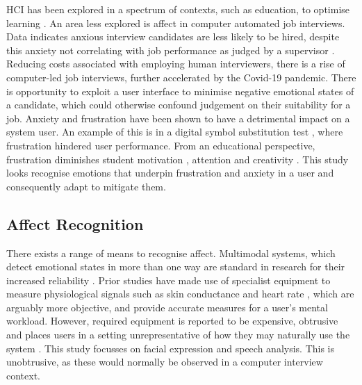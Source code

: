 \documentclass[12pt,a4paper]{article}
\begin{document}
HCI has been explored in a spectrum of contexts, such as education, to optimise learning \cite{graesser2005autotutor}. An area less explored is affect in computer automated job interviews. Data indicates anxious interview candidates are less likely to be hired, despite this anxiety not correlating with job performance as judged by a supervisor \cite{schneider2019does}. Reducing costs associated with employing human interviewers, there is a rise of computer-led job interviews, further accelerated by the Covid-19 pandemic. There is opportunity to exploit a user interface to minimise negative emotional states of a candidate, which could otherwise confound judgement on their suitability for a job. Anxiety and frustration have been shown to have a detrimental impact on a system user. An example of this is in a digital symbol substitution test \cite{burgess1964effects}, where frustration hindered user performance. From an educational perspective, frustration diminishes student motivation \cite{weiner1985attributional}, attention \cite{niedenthal1994emotional} and creativity \cite{isen1987positive}. This study looks recognise emotions that underpin frustration and anxiety in a user and consequently adapt to mitigate them.

\subsection{Affect Recognition}
There exists a range of means to recognise affect. Multimodal systems, which detect emotional states in more than one way are standard in research for their increased reliability \cite{jaimes2007multimodal}. Prior studies have made use of specialist equipment to measure physiological signals such as skin conductance and heart rate \cite{pantic2003toward}, which are arguably more objective, and provide accurate measures for a user's mental workload. However, required equipment is reported to be expensive, obtrusive and places users in a setting unrepresentative of how they may naturally use the system \cite{tao2019systematic}. This study focusses on facial expression and speech analysis. This is unobtrusive, as these would normally be observed in a computer interview context.
\end{document}
